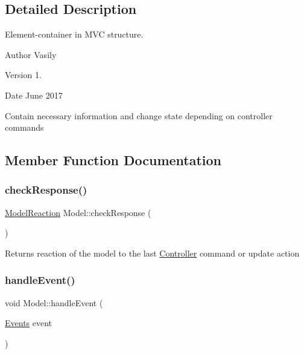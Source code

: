 \subsection{Detailed Description}
Element-\/container in M\+VC structure. 

\begin{DoxyAuthor}{Author}
Vasily 
\end{DoxyAuthor}
\begin{DoxyVersion}{Version}
1. 
\end{DoxyVersion}
\begin{DoxyDate}{Date}
June 2017
\end{DoxyDate}
Contain necessary information and change state depending on controller commands 

\subsection{Member Function Documentation}
\mbox{\label{class_model_aabbd887291832c912bc39487f829fb9a}} 
\subsubsection{\texorpdfstring{check\+Response()}{checkResponse()}}
{\footnotesize\ttfamily \hyperlink{_events_8h_a387f1fc6b8a0efa93d5fed71c3d9c0bc}{Model\+Reaction} Model\+::check\+Response (\begin{DoxyParamCaption}{ }\end{DoxyParamCaption})}

\begin{DoxyReturn}{Returns}
reaction of the model to the last \hyperlink{class_controller}{Controller} command or update action 
\end{DoxyReturn}
\mbox{\label{class_model_a2b3b7cbe02e7cac025290136e4c11e54}} 
\subsubsection{\texorpdfstring{handle\+Event()}{handleEvent()}}
{\footnotesize\ttfamily void Model\+::handle\+Event (\begin{DoxyParamCaption}\item[{\hyperlink{_events_8h_af60e00b78607064c5be6aa9397ea49c1}{Events}}]{event }\end{DoxyParamCaption})}




